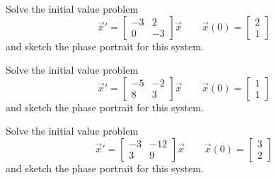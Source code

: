 \documentclass{ximera}
\begin{document}
\begin{exercise}
    Solve the initial value problem
    \[ 
        {\vec{x}}' = 
        \begin{bmatrix} 
            -3 & 2 \\ 
            0 & -3 
        \end{bmatrix} 
        \vec{x} \qquad \vec{x}(0) = 
        \begin{bmatrix} 
            2 \\ 
            1 
        \end{bmatrix} 
    \] 
    and sketch the phase portrait for this system.
\end{exercise}


\begin{exercise}
    Solve the initial value problem
    \[ 
        {\vec{x}}' = 
        \begin{bmatrix} 
            -5 & -2 \\ 
            8 & 3 
        \end{bmatrix} 
        \vec{x} \qquad \vec{x}(0) = 
        \begin{bmatrix} 
            1 \\ 
            1 
        \end{bmatrix} 
    \] 
    and sketch the phase portrait for this system.
\end{exercise}

\begin{exercise}
    Solve the initial value problem
    \[ 
        {\vec{x}}' = 
        \begin{bmatrix} 
            -3 & -12 \\ 
            3 & 9 
        \end{bmatrix}
        \vec{x} \qquad \vec{x}(0) = 
        \begin{bmatrix} 
            3 \\ 
            2  
        \end{bmatrix} 
    \] 
    and sketch the phase portrait for this system.
\end{exercise}
\end{document}
